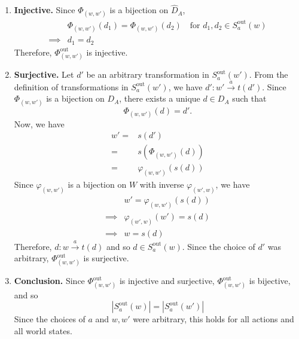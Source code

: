 \begin{proofE}
\begin{enumerate}[(1)]
\begin{enumerate}
        \item \textbf{Injective.}
        Since $\Phi_{(w, w')}$ is a bijection on $\hat{D}_{A}$,
        \begin{align}
            & \Phi_{(w, w')}(d_{1}) = \Phi_{(w, w')}(d_{2}) \quad \text{for $d_{1}, d_{2} \in S_{a}^{\text{out}}(w)$} \\
            \implies & d_{1} = d_{2}
        \end{align}
        Therefore, $\Phi_{(w, w')}^{\text{out}}$ is injective.

        \item \textbf{Surjective.}
        Let $d'$ be an arbitrary transformation in $S_{a}^{\text{out}}(w')$.
        From the definition of transformations in $S_{a}^{\text{out}}(w')$, we have $d': w' \xrightarrow{a} t(d')$.
        Since $\Phi_{(w, w')}$ is a bijection on $D_{A}$, there exists a unique $d \in D_{A}$ such that
        \begin{equation}
            \Phi_{(w, w')}(d) = d'.
        \end{equation}
        Now, we have
        \begin{align}
            w' = & s(d') \\
            = & s(\Phi_{(w, w')}(d)) \\
            = & \varphi_{(w, w')}(s(d))
        \end{align}
        Since $\varphi_{(w, w')}$ is a bijection on $W$ with inverse $\varphi_{(w', w)}$, we have
        \begin{align}
            & w' = \varphi_{(w, w')}(s(d)) \\
            \implies & \varphi_{(w', w)}(w') = s(d) \\
            \implies & w = s(d)
        \end{align}
        Therefore, $d: w \xrightarrow{a} t(d)$ and so $d \in S_{a}^{\text{out}}(w)$.
        Since the choice of $d'$ was arbitrary, $\Phi_{(w, w')}^{\text{out}}$ is surjective.

        \item \textbf{Conclusion.}
        Since $\Phi_{(w, w')}^{\text{out}}$ is injective and surjective, $\Phi_{(w, w')}^{\text{out}}$ is bijective, and so
        \begin{equation}
            |S_{a}^{\text{out}}(w)| = |S_{a}^{\text{out}}(w')|
        \end{equation}
        Since the choices of $a$ and $w, w'$ were arbitrary, this holds for all actions and all world states.
    \end{enumerate}


\end{enumerate}
\end{proofE}
